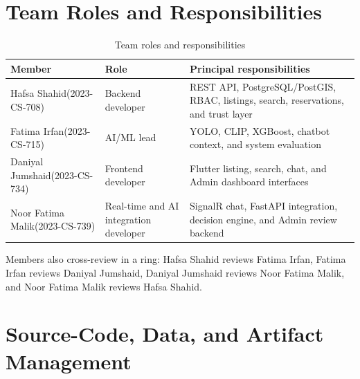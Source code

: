 \section{Team Roles and Responsibilities}
\begin{table}[H]
\centering
\caption{Team roles and responsibilities}
\label{tab:team-roles}
\begin{tabularx}{\textwidth}{@{}p{}p{}X@{}}
\toprule
\textbf{Member} & \textbf{Role} & \textbf{Principal responsibilities} \\
\midrule
Hafsa Shahid\newline (2023-CS-708) & Backend developer & REST API, PostgreSQL/PostGIS, RBAC, listings, search, reservations, and trust layer \\
Fatima Irfan\newline (2023-CS-715) & AI/ML lead & YOLO, CLIP, XGBoost, chatbot context, and system evaluation \\
Daniyal Jumshaid\newline (2023-CS-734) & Frontend developer & Flutter listing, search, chat, and Admin dashboard interfaces \\
Noor Fatima Malik\newline (2023-CS-739) & Real-time and AI integration developer & SignalR chat, FastAPI integration, decision engine, and Admin review backend \\
\bottomrule
\end{tabularx}
\end{table}

Members also cross-review in a ring: Hafsa Shahid reviews Fatima Irfan, Fatima Irfan reviews
Daniyal Jumshaid, Daniyal Jumshaid reviews Noor Fatima Malik, and Noor Fatima Malik reviews
Hafsa Shahid.

\section{Source-Code, Data, and Artifact Management}

